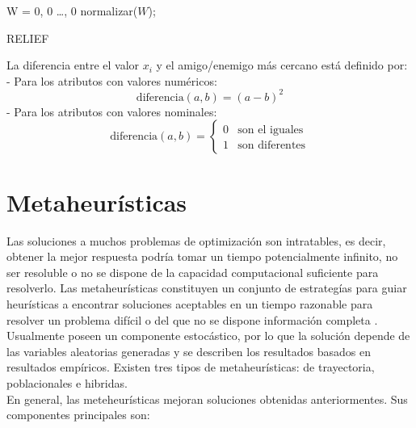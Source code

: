 \documentclass{ci5652}
\begin{document}
\begin{algorithm}
 \DontPrintSemicolon
 \vspace*{0.1cm}
  W = {0, 0 \dots, 0}\;
  normalizar($W$);\;
 \vspace*{0.1cm}
 \caption{RELIEF}
\end{algorithm}

La diferencia entre el valor $x_i$ y el amigo/enemigo más cercano está definido 
por: 
- Para los atributos con valores numéricos:
$$\text{diferencia}(a,b) = {(a - b)}^{2}$$
- Para los atributos con valores nominales:
\[
\text{diferencia}(a,b) = 
  \begin{cases}
    0 & \text{son el iguales}\\
    1 & \text{son diferentes}
  \end{cases} 
\]

\section{Metaheurísticas}

Las soluciones a muchos problemas de optimización son intratables, es decir,
obtener la mejor respuesta podría tomar un tiempo potencialmente infinito, no 
ser resoluble o no se dispone de la capacidad computacional suficiente para
resolverlo. Las metaheurísticas constituyen un conjunto de estrategías para 
guiar heurísticas a encontrar soluciones aceptables en un tiempo razonable para
resolver un problema difícil o del que no se dispone información completa
\cite{Talbi_2009}. Usualmente poseen un componente estocástico, por lo que la
solución depende de las variables aleatorias generadas y se describen los
resultados basados en resultados empíricos. Existen tres tipos de 
metaheurísticas: de trayectoria, poblacionales e hibridas.\\

En general, las meteheurísticas mejoran soluciones obtenidas anteriormentes. Sus
componentes principales son:
\end{document}
